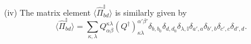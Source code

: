\documentclass[aps,reprint,superscriptaddress,amsmath,amssymb,amsfonts,prb]{revtex4-1}
\newcommand{\mbb}[1]{\mathbb{#1}}
\begin{document}
(iv) The matrix element $\langle \hat{\Pi}_{bd}^{\mbb{I}} \rangle$ is similarly given by
\begin{equation}
\langle \hat{\Pi}_{bd}^{\mbb{I}} \rangle = \sum_{\kappa, \lambda} Q_{\alpha \beta}^{\kappa \lambda} (Q^{\dagger})^{\alpha' \beta'}_{\kappa \lambda} \delta_{b,b_0} \delta_{d,d_0} \delta_{\lambda,\mbb{I}} \delta_{a',a} \delta_{b',b} \delta_{c',c} \delta_{d',d} .
\end{equation}
\end{document}
